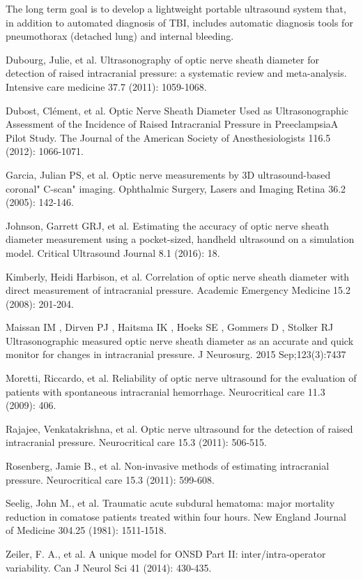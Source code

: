 \documentclass{llncs}
\begin{document}
The long term goal is to develop a lightweight portable ultrasound
system that, in addition to automated diagnosis of TBI, includes automatic
diagnosis tools for pneumothorax (detached lung) and internal bleeding.

%
%
\begin{thebibliography}{}
%
Dubourg, Julie, et al. 
Ultrasonography of optic nerve sheath diameter for detection of raised
intracranial pressure: a systematic review and meta-analysis.
Intensive care medicine 37.7 (2011): 1059-1068.

Dubost, Clément, et al. 
Optic Nerve Sheath Diameter Used as Ultrasonographic Assessment of the Incidence
of Raised Intracranial Pressure in PreeclampsiaA Pilot Study.  
The Journal of the American Society of Anesthesiologists 116.5 (2012): 1066-1071.

Garcia, Julian PS, et al. 
Optic nerve measurements by 3D ultrasound-based coronal" C-scan" imaging.
Ophthalmic Surgery, Lasers and Imaging Retina 36.2 (2005): 142-146.

Johnson, Garrett GRJ, et al. 
Estimating the accuracy of optic nerve sheath diameter measurement using a
pocket-sized, handheld ultrasound on a simulation model.  Critical Ultrasound
Journal 8.1 (2016): 18.

Kimberly, Heidi Harbison, et al. 
Correlation of optic nerve sheath diameter with direct measurement of
intracranial pressure.
Academic Emergency Medicine 15.2 (2008): 201-204.

Maissan IM , Dirven PJ , Haitsma IK , Hoeks SE , Gommers D , Stolker RJ 
Ultrasonographic measured optic nerve sheath diameter as an accurate and quick
monitor for changes in intracranial pressure. 
J Neurosurg. 2015 Sep;123(3):7437

Moretti, Riccardo, et al. 
Reliability of optic nerve ultrasound for the evaluation of patients with
spontaneous intracranial hemorrhage.
Neurocritical care 11.3 (2009): 406.

Rajajee, Venkatakrishna, et al. 
Optic nerve ultrasound for the detection of raised intracranial pressure. 
Neurocritical care 15.3 (2011): 506-515.

Rosenberg, Jamie B., et al. 
Non-invasive methods of estimating intracranial pressure.
Neurocritical care 15.3 (2011): 599-608.

Seelig, John M., et al. 
Traumatic acute subdural hematoma: major mortality reduction in comatose
patients treated within four hours.
New England Journal of Medicine 304.25 (1981): 1511-1518.

Zeiler, F. A., et al. 
A unique model for ONSD Part II: inter/intra-operator variability. 
Can J Neurol Sci 41 (2014): 430-435.



\end{thebibliography}
\end{document}
